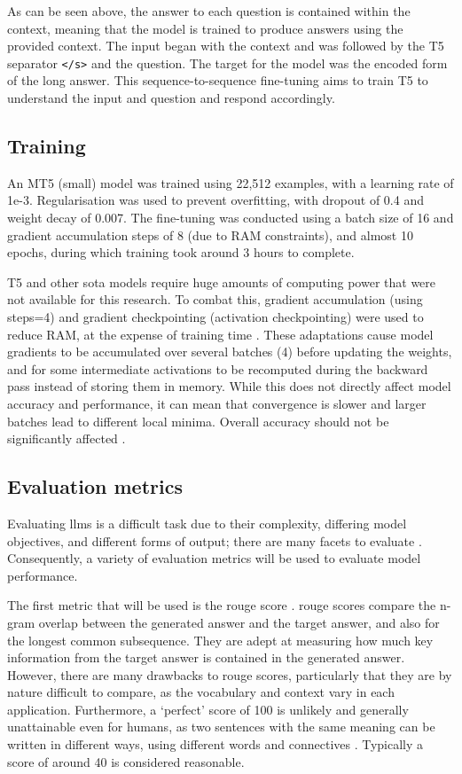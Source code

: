 As can be seen above, the answer to each question is contained within the context, meaning that the model is trained to produce answers using the provided context. The input began with the context and was followed by the T5 separator \texttt{</s>} and the question. The target for the model was the encoded form of the long answer. This sequence-to-sequence fine-tuning aims to train T5 to understand the input and question and respond accordingly.

\subsection{Training}\label{sec:methodology_qa_training}
An MT5 (small) model was trained using 22,512 examples, with a learning rate of 1e-3. Regularisation was used to prevent overfitting, with dropout of 0.4 and weight decay of 0.007. The fine-tuning was conducted using a batch size of 16 and gradient accumulation steps of 8 (due to RAM constraints), and almost 10 epochs, during which training took around 3 hours to complete. 

T5 and other \acrlong{sota} models require huge amounts of computing power that were not available for this research. To combat this, gradient accumulation (using steps=4) and gradient checkpointing  (activation checkpointing) were used to reduce RAM, at the expense of training time \citep{chen2016training}. These adaptations cause model gradients to be accumulated over several batches (4) before updating the weights, and for some intermediate activations to be recomputed during the backward pass instead of storing them in memory. While this does not directly affect model accuracy and performance, it can mean that convergence is slower and larger batches lead to different local minima. Overall accuracy should not be significantly affected \citep{gradientAccumulation}. 

\subsection{Evaluation metrics}
Evaluating \acrlong{llm}s is a difficult task due to their complexity, differing model objectives, and different forms of output; there are many facets to evaluate \citep{chang2023survey}. Consequently, a variety of evaluation metrics will be used to evaluate model performance.

The first metric that will be used is the \acrshort{rouge} score \citep{lin-2004-rouge}. \acrshort{rouge} scores compare the n-gram overlap between the generated answer and the target answer, and also for the longest common subsequence. They are adept at measuring how much key information from the target answer is contained in the generated answer. However, there are many drawbacks to \acrshort{rouge} scores, particularly that they are by nature difficult to compare, as the vocabulary and context vary in each application. Furthermore, a `perfect' score of 100 is unlikely and generally unattainable even for humans, as two sentences with the same meaning can be written in different ways, using different words and connectives \citep{schluter-2017-limits}. Typically a score of around 40 is considered reasonable.


